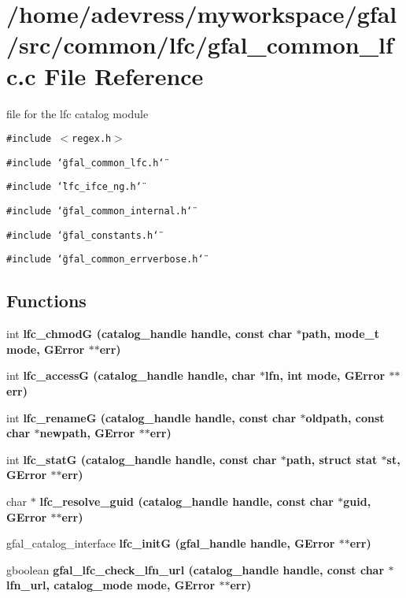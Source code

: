 \section{/home/adevress/myworkspace/gfal/src/common/lfc/gfal\_\-common\_\-lfc.c File Reference}
\label{gfal__common__lfc_8c}
file for the lfc catalog module 

{\tt \#include $<$regex.h$>$}\par
{\tt \#include \char`\"{}gfal\_\-common\_\-lfc.h\char`\"{}}\par
{\tt \#include \char`\"{}lfc\_\-ifce\_\-ng.h\char`\"{}}\par
{\tt \#include \char`\"{}gfal\_\-common\_\-internal.h\char`\"{}}\par
{\tt \#include \char`\"{}gfal\_\-constants.h\char`\"{}}\par
{\tt \#include \char`\"{}gfal\_\-common\_\-errverbose.h\char`\"{}}\par
\subsection*{Functions}
\begin{CompactItemize}
\item 
int \bf{lfc\_\-chmod\-G} (catalog\_\-handle handle, const char $\ast$path, mode\_\-t mode, GError $\ast$$\ast$err)
\item 
int \bf{lfc\_\-access\-G} (catalog\_\-handle handle, char $\ast$lfn, int mode, GError $\ast$$\ast$err)
\item 
int \bf{lfc\_\-rename\-G} (catalog\_\-handle handle, const char $\ast$oldpath, const char $\ast$newpath, GError $\ast$$\ast$err)
\item 
int \bf{lfc\_\-stat\-G} (catalog\_\-handle handle, const char $\ast$path, struct stat $\ast$st, GError $\ast$$\ast$err)
\item 
char $\ast$ \bf{lfc\_\-resolve\_\-guid} (catalog\_\-handle handle, const char $\ast$guid, GError $\ast$$\ast$err)
\item 
gfal\_\-catalog\_\-interface \bf{lfc\_\-init\-G} (gfal\_\-handle handle, GError $\ast$$\ast$err)
\item 
gboolean \bf{gfal\_\-lfc\_\-check\_\-lfn\_\-url} (catalog\_\-handle handle, const char $\ast$lfn\_\-url, catalog\_\-mode mode, GError $\ast$$\ast$err)
\end{CompactItemize}


